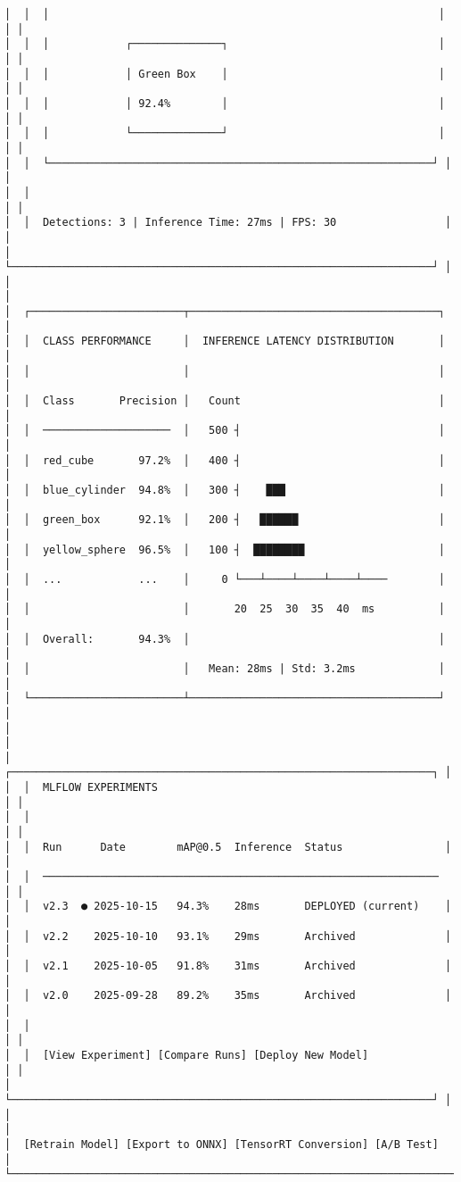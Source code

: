 \documentclass[
]{article}
\begin{document}
\begin{verbatim}
│  │  │                                                             │ │ │
│  │  │            ┌──────────────┐                                 │ │ │
│  │  │            │ Green Box    │                                 │ │ │
│  │  │            │ 92.4%        │                                 │ │ │
│  │  │            └──────────────┘                                 │ │ │
│  │  └────────────────────────────────────────────────────────────┘ │ │
│  │                                                                   │ │
│  │  Detections: 3 | Inference Time: 27ms | FPS: 30                 │ │
│  └──────────────────────────────────────────────────────────────────┘ │
│                                                                        │
│  ┌────────────────────────┬───────────────────────────────────────┐   │
│  │  CLASS PERFORMANCE     │  INFERENCE LATENCY DISTRIBUTION       │   │
│  │                        │                                       │   │
│  │  Class       Precision │   Count                               │   │
│  │  ────────────────────  │   500 ┤                               │   │
│  │  red_cube       97.2%  │   400 ┤                               │   │
│  │  blue_cylinder  94.8%  │   300 ┤    ███                        │   │
│  │  green_box      92.1%  │   200 ┤   ██████                      │   │
│  │  yellow_sphere  96.5%  │   100 ┤  ████████                     │   │
│  │  ...            ...    │     0 └───┴────┴────┴────┴────        │   │
│  │                        │       20  25  30  35  40  ms          │   │
│  │  Overall:       94.3%  │                                       │   │
│  │                        │   Mean: 28ms | Std: 3.2ms             │   │
│  └────────────────────────┴───────────────────────────────────────┘   │
│                                                                        │
│  ┌──────────────────────────────────────────────────────────────────┐ │
│  │  MLFLOW EXPERIMENTS                                              │ │
│  │                                                                   │ │
│  │  Run      Date        mAP@0.5  Inference  Status                │ │
│  │  ──────────────────────────────────────────────────────────────  │ │
│  │  v2.3  ● 2025-10-15   94.3%    28ms       DEPLOYED (current)    │ │
│  │  v2.2    2025-10-10   93.1%    29ms       Archived              │ │
│  │  v2.1    2025-10-05   91.8%    31ms       Archived              │ │
│  │  v2.0    2025-09-28   89.2%    35ms       Archived              │ │
│  │                                                                   │ │
│  │  [View Experiment] [Compare Runs] [Deploy New Model]             │ │
│  └──────────────────────────────────────────────────────────────────┘ │
│                                                                        │
│  [Retrain Model] [Export to ONNX] [TensorRT Conversion] [A/B Test]    │
└────────────────────────────────────────────────────────────────────────┘
\end{verbatim}
\end{document}

